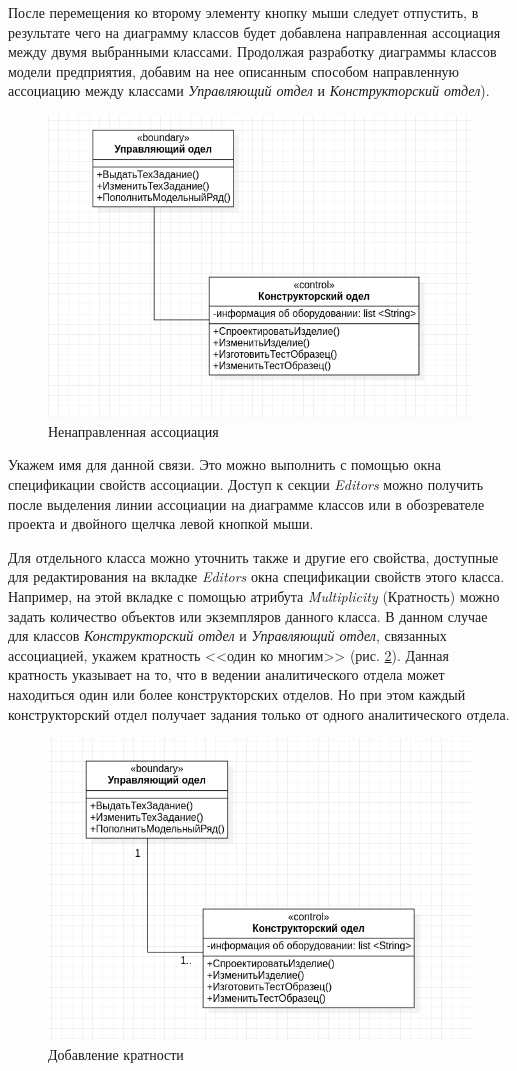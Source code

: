 \documentclass[a4paper,12pt]{report}
\begin{document}
После перемещения ко второму элементу кнопку мыши следует отпустить, в результате чего на диаграмму классов будет добавлена направленная ассоциация между двумя выбранными классами.
Продолжая разработку диаграммы классов модели предприятия, добавим на нее описанным способом направленную ассоциацию между классами \textit{Управляющий отдел} и \textit{Конструкторский отдел}).

\begin{figure}[h!]
	\centering
	\includegraphics[width=0.7\linewidth]{images/association}
	\caption{Ненаправленная ассоциация}
	\label{fig:association}
\end{figure}

Укажем имя для данной связи. Это можно выполнить с помощью окна спецификации свойств ассоциации. Доступ к секции \textit{Editors} можно получить после выделения линии ассоциации на диаграмме классов или в обозревателе проекта и двойного щелчка левой кнопкой мыши.

Для отдельного класса можно уточнить также и другие его свойства, доступные для редактирования на вкладке \textit{Editors} окна спецификации свойств этого класса. Например, на этой вкладке с помощью атрибута \textit{Multiplicity }(Кратность) можно задать количество объектов или экземпляров данного класса. В данном случае для классов \textit{Конструкторский отдел} и \textit{Управляющий отдел}, связанных ассоциацией, укажем кратность <<один ко многим>> (рис. \ref{fig:constructandanalitic}). Данная кратность указывает на то, что в ведении аналитического отдела может находиться один или более конструкторских отделов. Но при этом каждый конструкторский отдел получает задания только от одного аналитического отдела. 
\begin{figure}[h!]
	\centering
	\includegraphics[width=0.7\linewidth]{images/constructandanalitic}
	\caption{Добавление кратности}
	\label{fig:constructandanalitic}
\end{figure}
\end{document}
